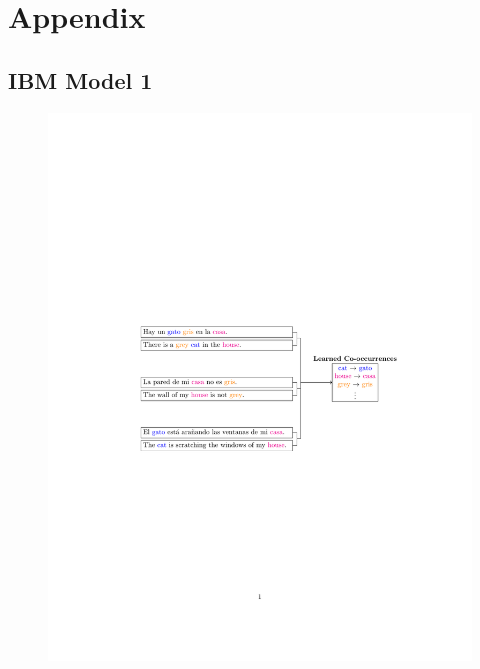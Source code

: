 \documentclass[landscape]{article}
\begin{document}

\cp
\thispagestyle{empty}
\section*{Appendix}
\vspace*{10mm}
\subsection*{IBM Model 1}
\begin{figure}[!htp]
\centering
\includegraphics[trim=4.5cm 10cm 3.5cm 10cm, scale=1.6, clip]{figures/ibm1}
\end{figure}
\end{document}

